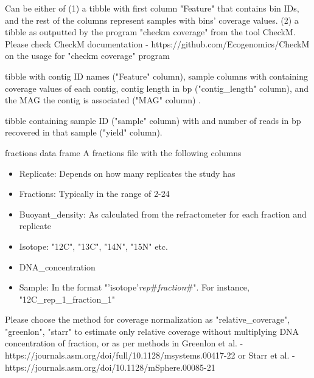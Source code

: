 \documentclass[a4paper]{book}
\begin{document}
\begin{Arguments}
\begin{ldescription}
\item[\code{f\_tibble}] Can be either of
(1) a tibble with first column "Feature" that contains bin IDs, and the rest of the columns represent samples with bins' coverage values.
(2) a tibble as outputted by the program "checkm coverage" from the tool CheckM. Please check CheckM documentation - https://github.com/Ecogenomics/CheckM on the usage for "checkm coverage" program

\item[\code{contig\_coverage}] tibble with contig ID names ("Feature" column), sample columns with  containing coverage values of each contig, contig length in bp ("contig\_length" column), and the MAG the contig is associated ("MAG" column) .

\item[\code{sequencing\_yield}] tibble containing sample ID ("sample" column) with  and number of reads in bp recovered in that sample ("yield" column).

\item[\code{fractions\_df}] fractions data frame
A fractions file with the following columns
\begin{itemize}

\item{} Replicate: Depends on how many replicates the study has
\item{} Fractions: Typically in the range of 2-24
\item{} Buoyant\_density: As calculated from the refractometer for each fraction and replicate
\item{} Isotope: "12C", "13C", "14N", "15N" etc.
\item{} DNA\_concentration
\item{} Sample: In the format "'isotope'\emph{rep}\#\emph{fraction}\#".
For instance, "12C\_rep\_1\_fraction\_1"

\end{itemize}


\item[\code{approach}] Please choose the method for coverage normalization as "relative\_coverage", "greenlon", "starr" to estimate only relative coverage without multiplying DNA concentration of fraction, or as per methods in Greenlon et al. - https://journals.asm.org/doi/full/10.1128/msystems.00417-22 or Starr et al. - https://journals.asm.org/doi/10.1128/mSphere.00085-21
\end{ldescription}
\end{Arguments}
\end{document}
